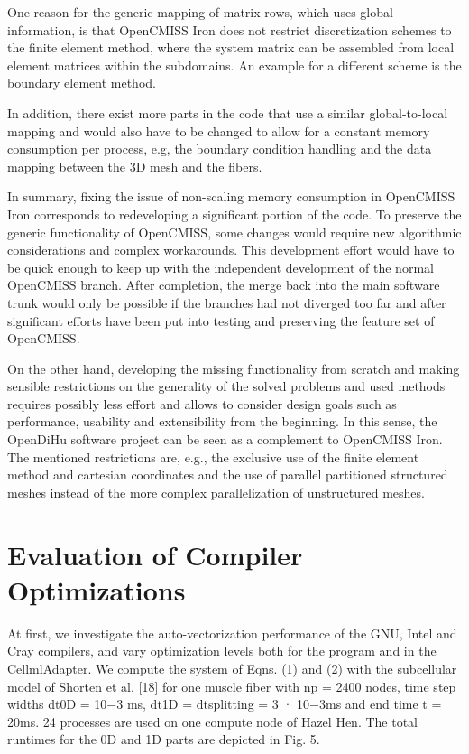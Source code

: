 One reason for the generic mapping of matrix rows, which uses global information, is that OpenCMISS Iron does not restrict discretization schemes to the finite element method, where the system matrix can be assembled from local element matrices within the subdomains. An example for a different scheme is the boundary element method.

In addition, there exist more parts in the code that use a similar global-to-local mapping and would also have to be changed to allow for a constant memory consumption per process, e.g, the boundary condition handling and the data mapping between the 3D mesh and the fibers.

In summary, fixing the issue of non-scaling memory consumption in OpenCMISS Iron corresponds to redeveloping a significant portion of the code. 
To preserve the generic functionality of OpenCMISS, some changes would require new algorithmic considerations and complex workarounds.
This development effort would have to be quick enough to keep up with the independent development of the normal OpenCMISS branch. After completion, the merge back into the main software trunk would only be possible if the branches had not diverged too far and after significant efforts have been put into testing and preserving the feature set of OpenCMISS.

On the other hand, developing the missing functionality from scratch and making sensible restrictions on the generality of the solved problems and used methods requires possibly less effort and allows to consider design goals such as performance, usability and extensibility from the beginning.
In this sense, the OpenDiHu software project can be seen as a complement to OpenCMISS Iron.  %
The mentioned restrictions are, e.g., the exclusive use of the finite element method and cartesian coordinates and the use of parallel partitioned structured meshes instead of the more complex parallelization of unstructured meshes.


\fi

\section{Evaluation of Compiler Optimizations}

At first, we investigate the auto-vectorization performance of the GNU, Intel
and Cray compilers, and vary optimization levels both for the program and
in the CellmlAdapter. We compute the system of Eqns. (1) and (2) with the
subcellular model of Shorten et al. [18] for one muscle fiber with np = 2400
nodes, time step widths dt0D = 10−3 ms, dt1D = dtsplitting = 3 · 10−3ms and
end time t = 20ms. 24 processes are used on one compute node of Hazel Hen.
The total runtimes for the 0D and 1D parts are depicted in Fig. 5.

